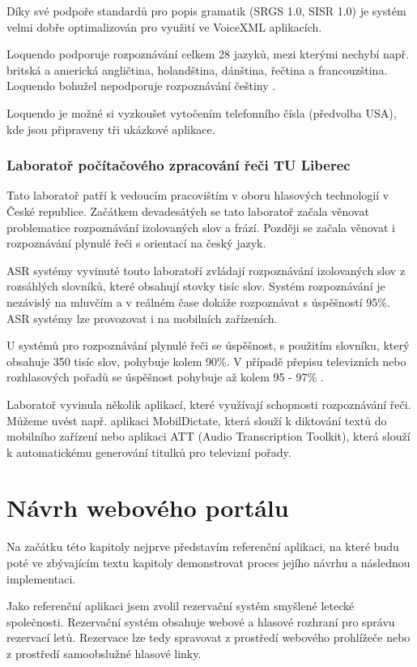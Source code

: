 \documentclass[ing,male,java,dept460,twoside]{diploma}						%
\begin{document}
Díky své podpoře standardů pro popis gramatik (SRGS 1.0, SISR 1.0) je systém velmi dobře optimalizován pro využití ve VoiceXML aplikacích.

Loquendo podporuje rozpoznávání celkem 28 jazyků, mezi kterými nechybí např. britská a americká angličtina, holandština, dánština, řečtina a francouzština. Loquendo bohužel nepodporuje rozpoznávání češtiny \cite{nuance_com}.

Loquendo je možné si vyzkoušet vytočením telefonního čísla (předvolba USA), kde jsou připraveny tři ukázkové aplikace.

\subsubsection{Laboratoř počítačového zpracování řeči TU Liberec}
Tato laboratoř patří k vedoucím pracovištím v oboru hlasových technologií v České republice. Začátkem devadesátých se tato laboratoř začala věnovat problematice rozpoznávání izolovaných slov a frází. Později se začala věnovat i rozpoznávání plynulé řeči s orientací na český jazyk.

ASR systémy vyvinuté touto laboratoří zvládají rozpoznávání izolovaných slov z rozsáhlých slovníků, které obsahují stovky tisíc slov. Systém rozpoznávání je nezávislý na mluvčím a v reálném čase dokáže rozpoznávat s úspěšností 95\%. ASR systémy lze provozovat i na mobilních zařízeních.

U systémů pro rozpoznávání plynulé řeči se úspěšnost, s použitím slovníku, který obsahuje 350 tisíc slov, pohybuje kolem 90\%. V případě přepisu televizních nebo rozhlasových pořadů se úspěšnost pohybuje až kolem 95 - 97\% \cite{speechlab}.

Laboratoř vyvinula několik aplikací, které využívají schopnosti rozpoznávání řeči. Můžeme uvést např. aplikaci MobilDictate, která slouží k diktování textů do mobilního zařízení nebo aplikaci ATT (Audio Transcription Toolkit), která slouží k automatickému generování titulků pro televizní pořady.

\section{Návrh webového portálu}
\label{sec:Navrh}
Na začátku této kapitoly nejprve představím referenční aplikaci, na které budu poté ve zbývajícím textu kapitoly demonstrovat proces jejího návrhu a následnou implementaci.

Jako referenční aplikaci jsem zvolil rezervační systém smyšlené letecké společnosti. Rezervační systém obsahuje webové a hlasové rozhraní pro správu rezervací letů. Rezervace lze tedy spravovat z prostředí webového prohlížeče nebo z prostředí samoobslužné hlasové linky.
\end{document}
